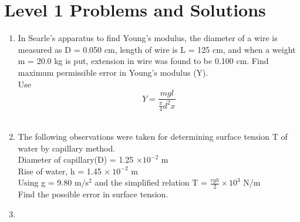 \section{Level 1 Problems and Solutions}
\begin{enumerate}
    \item In Searle’s apparatus to find Young’s modulus, the diameter of a wire is measured as D = 0.050 cm, length of wire is L = 125 cm, and when a weight m = 20.0 kg is put, extension in wire was found to be 0.100 cm. Find maximum permissible error in Young’s modulus (Y). \\
    Use \[Y = \frac{mgl}{\frac{\pi}{4}d^2x}\]\\
    \item The following observations were taken for determining surface tension T of water by capillary method. \\
    Diameter of capillary(D) = 1.25 $\times 10^{-2}$ m\\
    Rise of water, h = 1.45 $\times\ 10^{-2}$ m\\
    Using g = 9.80 m/s$^2$ and the simplified relation T = $\frac{rgh }{2}\times 10^3$ N/m \\
    Find the possible error in surface tension.  
    \item 
\end{enumerate}
